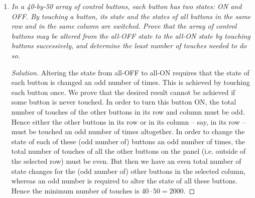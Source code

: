 \documentclass[12pt]{article}
\begin{document}
\begin{enumerate}[itemsep=2\bigskipamount,topsep=3\bigskipamount]
\begin{proof}[Solution]
We have
\[\begin{aligned}
&      & \frac{1}{r + s} & = \frac{1}{r + st} + \frac{1}{s + rt}\\
& \iff & (r + st)(s + rt) & = (r + s)(s + rt + r + st)\\
& \iff & rs + (r^{2} + s^{2})t + (rs)t^{2} & = (r + s)^{2} + (r + s)^{2}t\\
& \iff & rst^{2} - 2rst - (r^{2} + rs + s^{2}) & = 0\\
& \iff & t^{2} - 2t - 3 - \left(\frac{r}{s} + \frac{s}{r} - 2\right) & = 0\\
& \iff & t^{2} - 2t - 3 & = \frac{(r - s)^{2}}{rs}.
\end{aligned}\]
Therefore, it is enough to show that \(rs\) is the square of some rational number. Indeed, \(r, s, t \in \mathbb{Q}\), so \(t - 1 \in \mathbb{Q}\), and by the quadratic formula applied to \(t^{2} - 2t - (r/s + s/r + 1) = 0\), we find
\[t = 1 \pm \sqrt{2 + \frac{r}{s} + \frac{s}{r}} = 1 \pm \sqrt{\frac{(r + s)^{2}}{rs}},\]
so \(rs\) is the square of some rational number.
\end{proof}

\item \textit{In a 40-by-50 array of control buttons, each button has two states: ON and OFF. By touching a button, its state and the states of all buttons in the same row and in the same column are switched. Prove that the array of control buttons may be altered from the all-OFF state to the all-ON state by touching buttons successively, and determine the least number of touches needed to do so.}

\begin{proof}[Solution]
Altering the state from all-OFF to all-ON requires that the state of each button is changed an odd number of times. This is achieved by touching each button once. We prove that the desired result cannot be achieved if some button is never touched. In order to turn this button ON, the total number of touches of the other buttons in its row and column must be odd. Hence either the other buttons in its row or in its column -- say, in its row -- must be touched an odd number of times altogether. In order to change the state of each of these (odd number of) buttons an odd number of times, the total number of touches of all the other buttons on the panel (i.e. outside of the selected row) must be even. But then we have an even total number of state changes for the (odd number of) other buttons in the selected column, whereas an odd number is required to alter the state of all these buttons. Hence the minimum number of touches is $40 \cdot 50 = 2000$.
\end{proof}


\end{enumerate}
\end{document}
